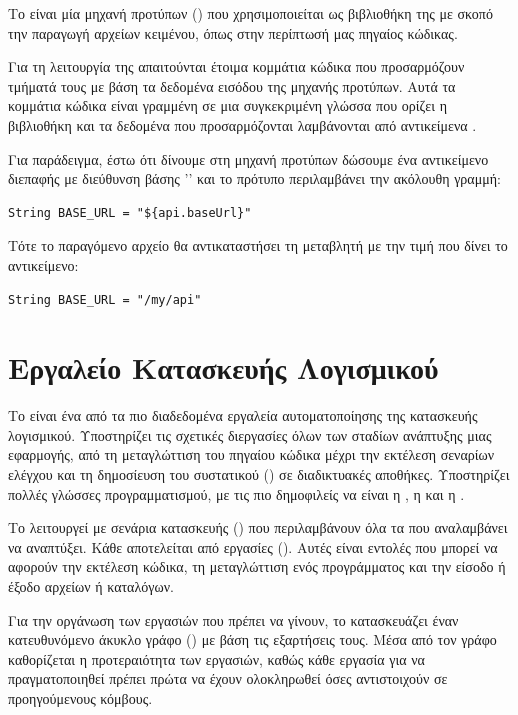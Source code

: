 Το  είναι μία μηχανή προτύπων () 
που χρησιμοποιείται ως βιβλιοθήκη της 
με σκοπό την παραγωγή αρχείων κειμένου,
όπως στην περίπτωσή μας πηγαίος κώδικας.

Για τη λειτουργία της απαιτούνται έτοιμα κομμάτια κώδικα
που προσαρμόζουν τμήματά τους με βάση τα δεδομένα εισόδου της μηχανής προτύπων.
Αυτά τα κομμάτια κώδικα είναι γραμμένη σε μια συγκεκριμένη γλώσσα που ορίζει η βιβλιοθήκη
και τα δεδομένα που προσαρμόζονται λαμβάνονται από αντικείμενα .

Για παράδειγμα,
έστω ότι δίνουμε στη μηχανή προτύπων δώσουμε ένα αντικείμενο διεπαφής με διεύθυνση βάσης ''
και το πρότυπο περιλαμβάνει την ακόλουθη γραμμή:

\begin{lstlisting}[deletekeywords={api,baseUrl}]
String BASE_URL = "${api.baseUrl}"
\end{lstlisting}

Τότε το παραγόμενο αρχείο θα αντικαταστήσει τη μεταβλητή με την τιμή που δίνει το αντικείμενο:

\begin{lstlisting}[deletekeywords={api}]
String BASE_URL = "/my/api"
\end{lstlisting}

\section{Εργαλείο Κατασκευής Λογισμικού }
Το  είναι ένα από τα πιο διαδεδομένα εργαλεία αυτοματοποίησης της κατασκευής λογισμικού.
Υποστηρίζει τις σχετικές διεργασίες όλων των σταδίων ανάπτυξης μιας εφαρμογής, 
από τη μεταγλώττιση του πηγαίου κώδικα μέχρι την εκτέλεση σεναρίων ελέγχου
και τη δημοσίευση του συστατικού () σε διαδικτυακές αποθήκες.
Υποστηρίζει πολλές γλώσσες προγραμματισμού,
με τις πιο δημοφιλείς να είναι η , η  και η .

Το  λειτουργεί με σενάρια κατασκευής ()
που περιλαμβάνουν όλα τα  που αναλαμβάνει να αναπτύξει.
Κάθε  αποτελείται από εργασίες ().
Αυτές είναι εντολές που μπορεί να αφορούν την εκτέλεση κώδικα,
τη μεταγλώττιση ενός προγράμματος και την είσοδο ή έξοδο αρχείων ή καταλόγων.

Για την οργάνωση των εργασιών που πρέπει να γίνουν,
το  κατασκευάζει έναν κατευθυνόμενο άκυκλο γράφο ()
με βάση τις εξαρτήσεις τους.
Μέσα από τον γράφο καθορίζεται η προτεραιότητα των εργασιών,
καθώς κάθε εργασία για να πραγματοποιηθεί 
πρέπει πρώτα να έχουν ολοκληρωθεί όσες αντιστοιχούν σε προηγούμενους κόμβους.

